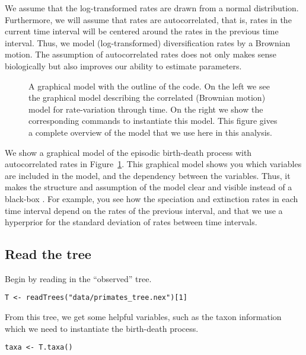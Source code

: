 We assume that the log-transformed rates are drawn from a normal distribution.
Furthermore, we will assume that rates are autocorrelated, that is, rates in the current time interval will be centered around the rates in the previous time interval.
Thus, we model (log-transformed) diversification rates by a Brownian motion.
The assumption of autocorrelated rates does not only makes sense biologically but also improves our ability to estimate parameters.
\begin{figure}[h!]
\centering
{}
\caption{\small A graphical model with the outline of the \Rev code. On the left we see the graphical model describing the correlated (Brownian motion) model for rate-variation through time. On the right we show the corresponding \Rev commands to instantiate this model. This figure gives a complete overview of the model that we use here in this analysis.}
\label{fig:EBD_GM}
\end{figure}
We show a graphical model of the episodic birth-death process with autocorrelated rates in Figure~\ref{fig:EBD_GM}.
This graphical model shows you which variables are included in the model, and the dependency between the variables.
Thus, it makes the structure and assumption of the model clear and visible instead of a black-box \citep{Hoehna2014b}.
For example, you see how the speciation and extinction rates in each time interval depend on the rates of the previous interval, and that we use a hyperprior for the standard deviation of rates between time intervals.


\subsection{Read the tree}

Begin by reading in the ``observed'' tree.

{\tt \begin{snugshade*}
\begin{lstlisting}
T <- readTrees("data/primates_tree.nex")[1]
\end{lstlisting}
\end{snugshade*}}

From this tree, we get some helpful variables, such as the taxon information which we need to instantiate the birth-death process.
{\tt \begin{snugshade*}
\begin{lstlisting}
taxa <- T.taxa()
\end{lstlisting}
\end{snugshade*}}

